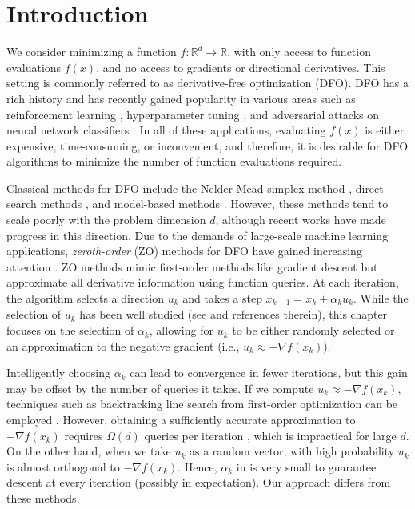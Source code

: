 \section{Introduction}
We consider minimizing a function $f: \mathbb{R}^{d}\to \mathbb{R}$, with only access to function evaluations $f(x)$, and no access to gradients or directional derivatives. This setting is commonly referred to as derivative-free optimization (DFO). DFO has a rich history and has recently gained popularity in various areas such as reinforcement learning \cite{salimans2017evolution,mania2018simple,choromanski2020provably}, hyperparameter tuning \cite{bergstra2012random}, and adversarial attacks on neural network classifiers \cite{chen2017zoo,cai2020zeroth}. In all of these applications, evaluating $f(x)$ is either expensive, time-consuming, or inconvenient, and therefore, it is desirable for DFO algorithms to minimize the number of function evaluations required.

Classical methods for DFO include the Nelder-Mead simplex method \cite{nelder1965simplex}, direct search methods \cite{kolda2003optimization}, and model-based methods \cite{conn2009introduction}. However, these methods tend to scale poorly with the problem dimension $d$, although recent works \cite{cartis2022scalable,cartis2022global,cartis2022dimensionality} have made progress in this direction. Due to the demands of large-scale machine learning applications, \textit{zeroth-order} (ZO) methods for DFO have gained increasing attention \cite{liu2020primer}. ZO methods mimic first-order methods like gradient descent but approximate all derivative information using function queries. At each iteration, the algorithm selects a direction $u_k$ and takes a step $x_{k+1} = x_k + \alpha_k u_k$. While the selection of $u_k$ has been well studied (see \cite{berahas2021theoretical} and references therein), this chapter focuses on the selection of $\alpha_k$, allowing for $u_k$ to be either randomly selected or an approximation to the negative gradient (i.e., $u_k \approx -\nabla f(x_k)$).

Intelligently choosing $\alpha_k$ can lead to convergence in fewer iterations, but this gain may be offset by the number of queries it takes. If we compute $u_k \approx -\nabla f(x_k)$, techniques such as backtracking line search from first-order optimization can be employed \cite{berahas2021global}. However, obtaining a sufficiently accurate approximation to $-\nabla f(x_k)$ requires $\Omega(d)$ queries per iteration \cite{berahas2021theoretical}, which is impractical for large $d$. On the other hand, when we take $u_k$ as a random vector, with high probability $u_k$ is almost orthogonal to $-\nabla f(x_k)$. Hence, $\alpha_k$ in \cite{ghadimi2013stochastic,nesterov2017random,bergou2020stochastic} is very small to guarantee descent at every iteration (possibly in expectation). Our approach differs from these methods.

